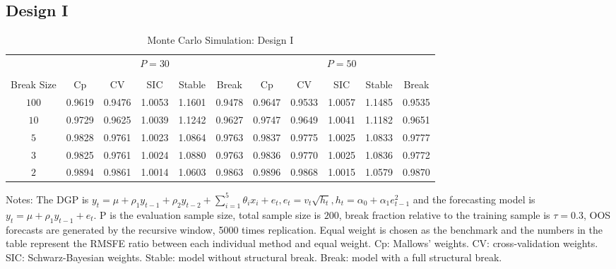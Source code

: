 \subsection{Design I}
\begin{table}
    \caption{Monte Carlo Simulation: Design I} \label{ntb:1}
    \centering
    \begin{adjustbox}{width=\textwidth,totalheight=\textheight,keepaspectratio}
    \begin{threeparttable}
    \begin{tabular}{ccccccccccc}
    \toprule
     & \multicolumn{5}{c}{$P = 30$} & \multicolumn{5}{c}{$P = 50$} \\
    \cmidrule(r){2-6}
    \cmidrule(r){7-11} \\
      Break Size   & Cp     &   CV   & SIC    & Stable & Break  & Cp     & CV     & SIC    & Stable & Break \\
             $100$ & 0.9619 & 0.9476 & 1.0053 & 1.1601 & 0.9478 & 0.9647 & 0.9533 & 1.0057 & 1.1485 & 0.9535 \\
             $10$  & 0.9729 & 0.9625 & 1.0039 & 1.1242 & 0.9627 & 0.9747 & 0.9649 & 1.0041 & 1.1182 & 0.9651 \\
             $5$   & 0.9828 & 0.9761 & 1.0023 & 1.0864 & 0.9763 & 0.9837 & 0.9775 & 1.0025 & 1.0833 & 0.9777 \\
             $3$   & 0.9825 & 0.9761 & 1.0024 & 1.0880 & 0.9763 & 0.9836 & 0.9770 & 1.0025 & 1.0836 & 0.9772 \\
             $2$   & 0.9894 & 0.9861 & 1.0014 & 1.0603 & 0.9863 & 0.9896 & 0.9868 & 1.0015 & 1.0579 & 0.9870 \\
    \bottomrule
    \end{tabular}
    \begin{tablenotes} \footnotesize
    Notes: The DGP is $y_{t} = \mu + \rho_{1}y_{t-1} + \rho_{2}y_{t-2} + \sum_{i=1}^{5}\theta_{i}x_{i} + e_{t}, e_{t} = v_{t}\sqrt{h_{t}}, h_{t} = \alpha_{0} + \alpha_{1}e_{t-1}^2$ and the forecasting model is $y_{t} = \mu + \rho_{1}y_{t-1} + e_{t}$. $\mathrm{P}$ is the evaluation sample size, total sample size is $200$, break fraction relative to the training sample is $\tau = 0.3$, OOS forecasts are generated by the recursive window, 5000 times replication. Equal weight is chosen as the benchmark and the numbers in the table represent the RMSFE ratio between each individual method and equal weight. Cp: Mallows' weights. CV: cross-validation weights. SIC: Schwarz-Bayesian weights. Stable: model without structural break. Break: model with a full structural break.
    \end{tablenotes}
    \end{threeparttable}
    \end{adjustbox}
\end{table}
